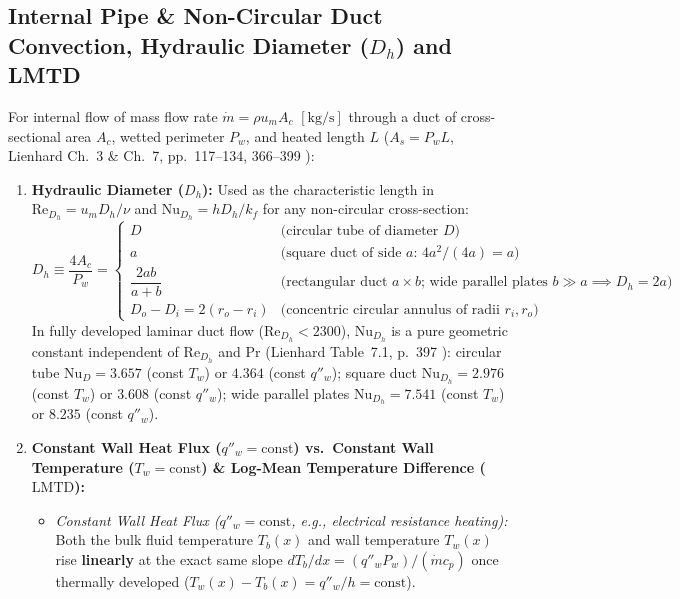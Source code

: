 \subsection{Internal Pipe \& Non-Circular Duct Convection, Hydraulic Diameter ($D_h$) and LMTD}
For internal flow of mass flow rate $\dot{m} = \rho u_m A_c$ $[\si{\kilogram\per\second}]$ through a duct of cross-sectional area $A_c$, wetted perimeter $P_w$, and heated length $L$ ($A_s = P_w L$, Lienhard Ch.~3 \& Ch.~7, pp.~117--134, 366--399 ):
\begin{enumerate}
  \item \textbf{Hydraulic Diameter ($D_h$):} Used as the characteristic length in $\mathrm{Re}_{D_h} = u_m D_h / \nu$ and $\mathrm{Nu}_{D_h} = h D_h / k_f$ for any non-circular cross-section:
  \begin{equation}
    D_h \equiv \frac{4 A_c}{P_w} = \begin{cases} D & \text{(circular tube of diameter } D\text{)} \\ a & \text{(square duct of side } a\text{: } 4a^2/(4a) = a\text{)} \\ \dfrac{2ab}{a + b} & \text{(rectangular duct } a\times b\text{; wide parallel plates } b \gg a \implies D_h = 2a\text{)} \\ D_o - D_i = 2(r_o - r_i) & \text{(concentric circular annulus of radii } r_i, r_o\text{)} \end{cases}
    \label{eq:11:hydraulic-diameter}
  \end{equation}
  In fully developed laminar duct flow ($\mathrm{Re}_{D_h} < 2300$), $\mathrm{Nu}_{D_h}$ is a pure geometric constant independent of $\mathrm{Re}_{D_h}$ and $\mathrm{Pr}$ (Lienhard Table~7.1, p.~397 ): circular tube $\mathrm{Nu}_D = 3.657$ (const $T_w$) or $4.364$ (const $q''_w$); square duct $\mathrm{Nu}_{D_h} = 2.976$ (const $T_w$) or $3.608$ (const $q''_w$); wide parallel plates $\mathrm{Nu}_{D_h} = 7.541$ (const $T_w$) or $8.235$ (const $q''_w$).
  \item \textbf{Constant Wall Heat Flux ($q''_w = \mathrm{const}$) vs.\ Constant Wall Temperature ($T_w = \mathrm{const}$) \& Log-Mean Temperature Difference ($\mathrm{LMTD}$):}
  \begin{itemize}
    \item \emph{Constant Wall Heat Flux ($q''_w = \mathrm{const}$, e.g., electrical resistance heating):} Both the bulk fluid temperature $T_b(x)$ and wall temperature $T_w(x)$ rise \textbf{linearly} at the exact same slope $dT_b/dx = (q''_w P_w)/(\dot{m} c_p)$ once thermally developed ($T_w(x) - T_b(x) = q''_w / h = \mathrm{const}$).

\end{itemize}
\end{enumerate}
